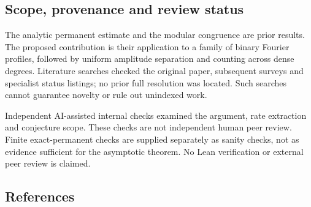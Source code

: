 \documentclass[
  11pt,
]{article}
\begin{document}
\subsection{Scope, provenance and review
status}\label{scope-provenance-and-review-status}

The analytic permanent estimate and the modular congruence are prior
results. The proposed contribution is their application to a family of
binary Fourier profiles, followed by uniform amplitude separation and
counting across dense degrees. Literature searches checked the original
paper, subsequent surveys and specialist status listings; no prior full
resolution was located. Such searches cannot guarantee novelty or rule
out unindexed work.

Independent AI-assisted internal checks examined the argument, rate
extraction and conjecture scope. These checks are not independent human
peer review. Finite exact-permanent checks are supplied separately as
sanity checks, not as evidence sufficient for the asymptotic theorem. No
Lean verification or external peer review is claimed.

\subsection{References}\label{references}
\end{document}

